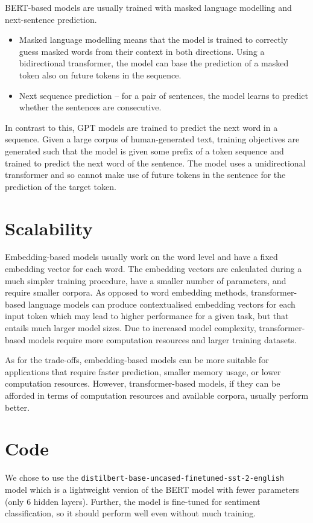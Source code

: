 BERT-based models are usually trained with masked language modelling and next-sentence prediction.
\begin{itemize}
    \item Masked language modelling means that the model is trained to correctly guess masked words from their context in both directions. Using a bidirectional transformer, the model can base the prediction of a masked token also on future tokens in the sequence.
    \item Next sequence prediction -- for a pair of sentences, the model learns to predict whether the sentences are consecutive.
\end{itemize}
In contrast to this, GPT models are trained to predict the next word in a sequence. Given a large corpus of human-generated text, training objectives are generated such that the model is given some prefix of a token sequence and trained to predict the next word of the sentence. The model uses a unidirectional transformer and so cannot make use of future tokens in the sentence for the prediction of the target token.

\section{Scalability}

Embedding-based models usually work on the word level and have a fixed embedding vector for each word. The embedding vectors are calculated during a much simpler training procedure, have a smaller number of parameters, and require smaller corpora.
As opposed to word embedding methods, transformer-based language models can produce contextualised embedding vectors for each input token which may lead to higher performance for a given task, but that entails much larger model sizes. Due to increased model complexity, transformer-based models require more computation resources and larger training datasets.

As for the trade-offs, embedding-based models can be more suitable for applications that require faster prediction, smaller memory usage, or lower computation resources. However, transformer-based models, if they can be afforded in terms of computation resources and available corpora, usually perform better.

\section{Code}

We chose to use the \texttt{distilbert-base-uncased-finetuned-sst-2-english} model which is a lightweight version of the BERT model with fewer parameters (only 6 hidden layers). Further, the model is fine-tuned for sentiment classification, so it should perform well even without much training.

